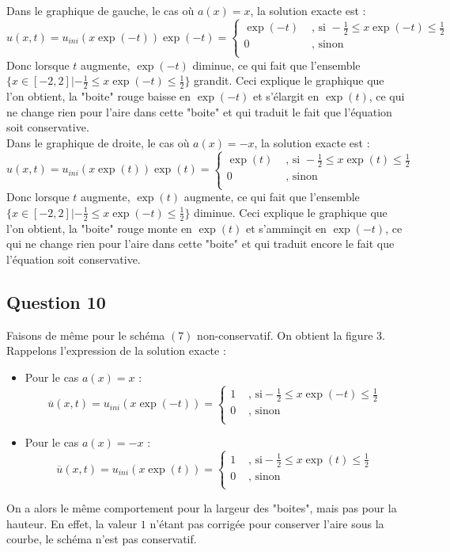 \documentclass[a4paper,12pt]{article}
\begin{document}
Dans le graphique de gauche, le cas o\`u $a(x)=x$, la solution exacte est :
\[\hat{u}(x,t)=u_{ini}(x\exp(-t))\exp(-t)=\left\{\begin{array}{ccccc}
\exp(-t) & \text{ , si }-\frac{1}{2} \leq x\exp(-t) \leq \frac{1}{2}\\
0 & \text{ , sinon}\\
\end{array}
\right.
\]
Donc lorsque $t$ augmente, $\exp(-t)$ diminue, ce qui fait que l'ensemble $\{x\in[-2,2] | -\frac{1}{2} \leq x\exp(-t) \leq \frac{1}{2}\}$ grandit. Ceci explique le graphique que l'on obtient, la "boite" rouge baisse en $\exp(-t)$ et s'\'elargit en $\exp(t)$, ce qui ne change rien pour l'aire dans cette "boite" et qui traduit le fait que l'\'equation soit conservative.\\

Dans le graphique de droite, le cas o\`u $a(x)=-x$, la solution exacte est :
\[\hat{u}(x,t)=u_{ini}(x\exp(t))\exp(t)=\left\{\begin{array}{ccccc}
\exp(t) & \text{ , si }-\frac{1}{2} \leq x\exp(t) \leq \frac{1}{2}\\
0 & \text{ , sinon}\\
\end{array}
\right.
\]
Donc lorsque $t$ augmente, $\exp(t)$ augmente, ce qui fait que l'ensemble $\{x\in[-2,2] | -\frac{1}{2} \leq x\exp(-t) \leq \frac{1}{2}\}$ diminue. Ceci explique le graphique que l'on obtient, la "boite" rouge monte en $\exp(t)$ et s'ammin\c{c}it en $\exp(-t)$, ce qui ne change rien pour l'aire dans cette "boite" et qui traduit encore le fait que l'\'equation soit conservative.

\subsection{Question 10}

Faisons de m\^eme pour le sch\'ema $(7)$ non-conservatif. On obtient la figure 3.\\
Rappelons l'expression de la solution exacte :\\
\begin{itemize}
\item Pour le cas $a(x)=x$ :
\[\overline{u}(x,t)=u_{ini}(x\exp(-t))=\left\{\begin{array}{ccccc}
1 & \text{ , si} -\frac{1}{2} \leq x\exp(-t) \leq \frac{1}{2}\\
0 & \text{ , sinon}\\
\end{array}
\right.
\]
\item Pour le cas $a(x)=-x$ :
\[\overline{u}(x,t)=u_{ini}(x\exp(t))=\left\{\begin{array}{ccccc}
1 & \text{ , si} -\frac{1}{2} \leq x\exp(t) \leq \frac{1}{2}\\
0 & \text{ , sinon}\\
\end{array}
\right.
\]
\end{itemize}
On a alors le m\^eme comportement pour la largeur des "boites", mais pas pour la hauteur. En effet, la valeur $1$ n'\'etant pas corrig\'ee pour conserver l'aire sous la courbe, le sch\'ema n'est pas conservatif.
\end{document}
